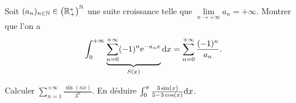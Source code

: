 \documentclass[12pt]{article}
\begin{document}
\begin{exercise}
    Soit $(a_n)_{n\in\mathbb{N}}\in\left(\mathbb{R}_{+}^{*}\right)^{\mathbb{N}}$ une suite croissance telle que $\lim\limits_{n\to+\infty}a_n=+\infty$. Montrer que l'on a 
    \begin{equation}
        \int_{0}^{+\infty}\underbrace{\sum_{n=0}^{+\infty}(-1)^{n}\mathrm{e}^{-a_n x}}_{S(x)}\mathrm{d} x=\sum_{n=0}^{+\infty}\frac{(-1)^{n}}{a_n}.
    \end{equation}
\end{exercise}

\begin{exercise}
    Calculer $\sum_{n=1}^{+\infty}\frac{\sin(nx)}{3^{n}}$. En déduire $\int_{0}^{\pi}\frac{3\sin(x)}{5-3\cos(x)}\mathrm{d} x$.
\end{exercise}
\end{document}
